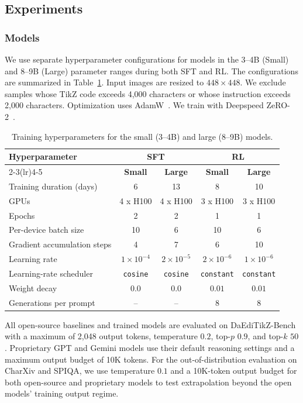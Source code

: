 \subsection{Experiments}
\label{subsec:Experiments}

\subsubsection{Models}
\label{subsubsec:Models}
We use separate hyperparameter configurations for models in the 3--4B (Small) and 8--9B (Large) parameter ranges during both SFT and RL. The configurations are summarized in Table~\ref{tab:summary_hyperparameters}. Input images are resized to $448\times448$. We exclude samples whose TikZ code exceeds 4,000 characters or whose instruction exceeds 2,000 characters. Optimization uses AdamW~\citep{loshchilov2019decoupledweightdecayregularization}. We train with Deepspeed ZeRO-2~\citep{rajbhandari2020zero}.
\begin{table}[t]
\centering
\caption{Training hyperparameters for the small (3--4B) and large (8--9B) models.}
\label{tab:summary_hyperparameters}
\small
\setlength{\tabcolsep}{8pt}
\renewcommand{\arraystretch}{1.02}
\begin{tabular}{lcc|cc}
\toprule
\multirow{2}{*}{\textbf{Hyperparameter}} &
\multicolumn{2}{c}{\textbf{SFT}} &
\multicolumn{2}{c}{\textbf{RL}} \\
\cmidrule(lr){2-3}\cmidrule(lr){4-5}
& \textbf{Small} & \textbf{Large}
& \textbf{Small} & \textbf{Large} \\
\midrule
Training duration (days)
& 6 & 13 & 8 & 10 \\
GPUs
& 4 x H100 & 4 x H100 & 3 x H100 & 3 x H100 \\
Epochs
& 2 & 2 & 1 & 1 \\
Per-device batch size
& 10 & 6 & 10 & 6 \\
Gradient accumulation steps
& 4 & 7 & 6 & 10 \\
Learning rate
& $1\times10^{-4}$ & $2\times10^{-5}$
& $2\times10^{-6}$ & $1\times10^{-6}$ \\
Learning-rate scheduler
& \texttt{cosine} & \texttt{cosine}
& \texttt{constant} & \texttt{constant} \\
Weight decay
& $0.0$ & $0.0$ & $0.01$ & $0.01$ \\
Generations per prompt
& -- & -- & 8 & 8 \\
\bottomrule
\end{tabular}
\end{table}
All open-source baselines and trained models are evaluated on
DaEdiTikZ-Bench with a maximum of 2,048 output tokens, temperature $0.2$, top-$p$ $0.9$, and top-$k$ $50$. Proprietary GPT and Gemini models use their default reasoning settings and a maximum output budget of 10K tokens. For the out-of-distribution evaluation on CharXiv and SPIQA, we use temperature $0.1$ and a 10K-token output budget for both open-source and proprietary models to test extrapolation beyond the open models’ training output regime.

